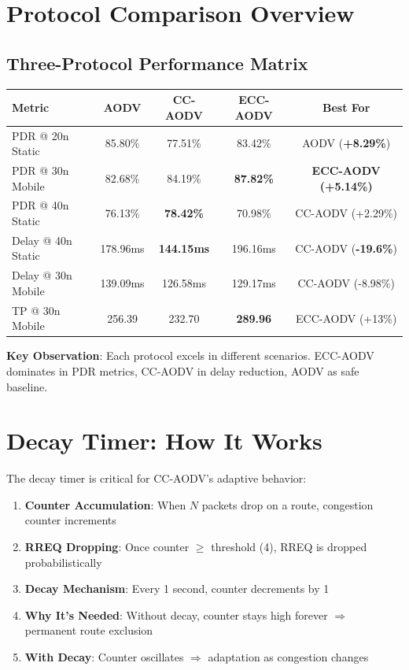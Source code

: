 \documentclass[12pt]{article}
\begin{document}
\section*{Protocol Comparison Overview}

\subsection*{Three-Protocol Performance Matrix}

\begin{center}
\begin{tabular}{l|ccc|c}
\toprule
\textbf{Metric} & \textbf{AODV} & \textbf{CC-AODV} & \textbf{ECC-AODV} & \textbf{Best For} \\
\midrule
PDR @ 20n Static & 85.80\% & 77.51\% & 83.42\% & AODV (\textbf{+8.29\%}) \\
PDR @ 30n Mobile & 82.68\% & 84.19\% & \textbf{87.82\%} & \textbf{ECC-AODV (+5.14\%)} \\
PDR @ 40n Static & 76.13\% & \textbf{78.42\%} & 70.98\% & CC-AODV (+2.29\%) \\
\midrule
Delay @ 40n Static & 178.96ms & \textbf{144.15ms} & 196.16ms & CC-AODV (\textbf{-19.6\%}) \\
Delay @ 30n Mobile & 139.09ms & 126.58ms & 129.17ms & CC-AODV (-8.98\%) \\
\midrule
TP @ 30n Mobile & 256.39 & 232.70 & \textbf{289.96} & ECC-AODV (+13\%) \\
\bottomrule
\end{tabular}
\end{center}

\noindent
\textbf{Key Observation}: Each protocol excels in different scenarios. ECC-AODV dominates in PDR metrics, CC-AODV in delay reduction, AODV as safe baseline.

\section*{Decay Timer: How It Works}

The decay timer is critical for CC-AODV's adaptive behavior:

\begin{enumerate}
    \item \textbf{Counter Accumulation}: When $N$ packets drop on a route, congestion counter increments
    \item \textbf{RREQ Dropping}: Once counter $\geq$ threshold (4), RREQ is dropped probabilistically
    \item \textbf{Decay Mechanism}: Every 1 second, counter decrements by 1
    \item \textbf{Why It's Needed}: Without decay, counter stays high forever $\Rightarrow$ permanent route exclusion
    \item \textbf{With Decay}: Counter oscillates $\Rightarrow$ adaptation as congestion changes
\end{enumerate}
\end{document}
